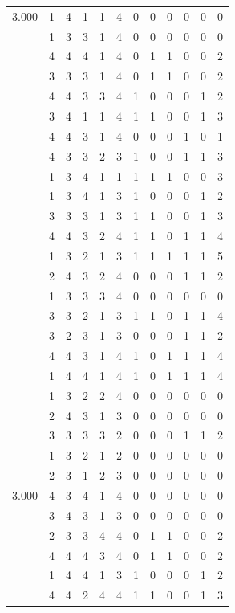 \documentclass[]{book}
\theoremstyle{definition}
\theoremstyle{definition}
\theoremstyle{definition}
\theoremstyle{remark}
\begin{document}
\begin{table}
{\begin{tabular}[t]{rrrrrrrrrrrr}
3.000 & 1 & 4 & 1 & 1 & 4 & 0 & 0 & 0 & 0 & 0 & 0\\
 & 1 & 3 & 3 & 1 & 4 & 0 & 0 & 0 & 0 & 0 & 0\\
 & 4 & 4 & 4 & 1 & 4 & 0 & 1 & 1 & 0 & 0 & 2\\
 & 3 & 3 & 3 & 1 & 4 & 0 & 1 & 1 & 0 & 0 & 2\\
 & 4 & 4 & 3 & 3 & 4 & 1 & 0 & 0 & 0 & 1 & 2\\
 & 3 & 4 & 1 & 1 & 4 & 1 & 1 & 0 & 0 & 1 & 3\\
 & 4 & 4 & 3 & 1 & 4 & 0 & 0 & 0 & 1 & 0 & 1\\
 & 4 & 3 & 3 & 2 & 3 & 1 & 0 & 0 & 1 & 1 & 3\\
 & 1 & 3 & 4 & 1 & 1 & 1 & 1 & 1 & 0 & 0 & 3\\
 & 1 & 3 & 4 & 1 & 3 & 1 & 0 & 0 & 0 & 1 & 2\\
 & 3 & 3 & 3 & 1 & 3 & 1 & 1 & 0 & 0 & 1 & 3\\
 & 4 & 4 & 3 & 2 & 4 & 1 & 1 & 0 & 1 & 1 & 4\\
 & 1 & 3 & 2 & 1 & 3 & 1 & 1 & 1 & 1 & 1 & 5\\
 & 2 & 4 & 3 & 2 & 4 & 0 & 0 & 0 & 1 & 1 & 2\\
 & 1 & 3 & 3 & 3 & 4 & 0 & 0 & 0 & 0 & 0 & 0\\
 & 3 & 3 & 2 & 1 & 3 & 1 & 1 & 0 & 1 & 1 & 4\\
 & 3 & 2 & 3 & 1 & 3 & 0 & 0 & 0 & 1 & 1 & 2\\
 & 4 & 4 & 3 & 1 & 4 & 1 & 0 & 1 & 1 & 1 & 4\\
 & 1 & 4 & 4 & 1 & 4 & 1 & 0 & 1 & 1 & 1 & 4\\
 & 1 & 3 & 2 & 2 & 4 & 0 & 0 & 0 & 0 & 0 & 0\\
 & 2 & 4 & 3 & 1 & 3 & 0 & 0 & 0 & 0 & 0 & 0\\
 & 3 & 3 & 3 & 3 & 2 & 0 & 0 & 0 & 1 & 1 & 2\\
 & 1 & 3 & 2 & 1 & 2 & 0 & 0 & 0 & 0 & 0 & 0\\
 & 2 & 3 & 1 & 2 & 3 & 0 & 0 & 0 & 0 & 0 & 0\\
3.000 & 4 & 3 & 4 & 1 & 4 & 0 & 0 & 0 & 0 & 0 & 0\\
 & 3 & 4 & 3 & 1 & 3 & 0 & 0 & 0 & 0 & 0 & 0\\
 & 2 & 3 & 3 & 4 & 4 & 0 & 1 & 1 & 0 & 0 & 2\\
 & 4 & 4 & 4 & 3 & 4 & 0 & 1 & 1 & 0 & 0 & 2\\
 & 1 & 4 & 4 & 1 & 3 & 1 & 0 & 0 & 0 & 1 & 2\\
 & 4 & 4 & 2 & 4 & 4 & 1 & 1 & 0 & 0 & 1 & 3\\

\end{tabular}}
\end{table}
\end{document}
